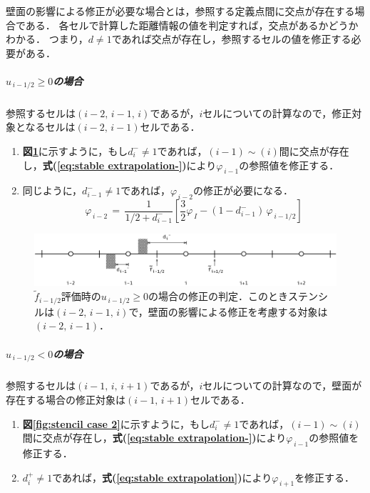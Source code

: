 壁面の影響による修正が必要な場合とは，参照する定義点間に交点が存在する場合である．
各セルで計算した距離情報の値を判定すれば，交点があるかどうかわかる．
つまり，$d\ne1$であれば交点が存在し，参照するセルの値を修正する必要がある．

%
\vspace{5mm}
\subparagraph{$u_{\,i-1/2}\ge0$の場合}
参照するセルは$(i-2,\,i-1,\,i)$であるが，$i$セルについての計算なので，修正対象となるセルは$(i-2,\,i-1)$セルである．

\begin{enumerate}
\item \textbf{図\ref{fig:stencil case 1}}に示すように，もし$d_i^- \ne 1$であれば，$(i-1)\sim (i)$間に交点が存在し，\textbf{式(\ref{eq:stable extrapolation-})}により$\varphi_{\,i-1}$の参照値を修正する．
\vspace{1mm}
\item 同じように，$d_{i-1}^- \ne 1$であれば，$\varphi_{\,i-2}$の修正が必要になる．
\begin{equation}
\varphi_{\,i-2} \,=\, \frac{1}{1/2+d_{i-1}^-} \left[ \frac{3}{2}\varphi_{\,I} - (1-d_{i-1}^-)\,\varphi_{\,i-1/2} \right]
\label{eq:modify i-2}
\end{equation}
\end{enumerate}

\begin{figure}[htbp]
\begin{center}
\includegraphics[width=15cm,clip]{stencil_case1.eps}
\end{center}
\caption{$\tilde{f}_{i-1/2}$評価時の$u_{\,i-1/2}\ge0$の場合の修正の判定．このときステンシルは$(i-2,\,i-1,\,i)$で，壁面の影響による修正を考慮する対象は$(i-2,\,i-1)$．}
\label{fig:stencil case 1}
\end{figure}


%
\vspace{5mm}
\subparagraph{$u_{\,i-1/2}<0$の場合}
参照するセルは$(i-1,\,i,\,i+1)$であるが，$i$セルについての計算なので，壁面が存在する場合の修正対象は$(i-1,\,i+1)$セルである．

\begin{enumerate}
\item \textbf{図\ref{fig:stencil case 2}}に示すように，もし$d_i^- \ne 1$であれば，$(i-1)\sim (i)$間に交点が存在し，\textbf{式(\ref{eq:stable extrapolation-})}により$\varphi_{\,i-1}$の参照値を修正する．
\vspace{1mm}
\item $d_{i}^+ \ne 1$であれば，\textbf{式(\ref{eq:stable extrapolation})}により$\varphi_{\,i+1}$を修正する．
\end{enumerate}

